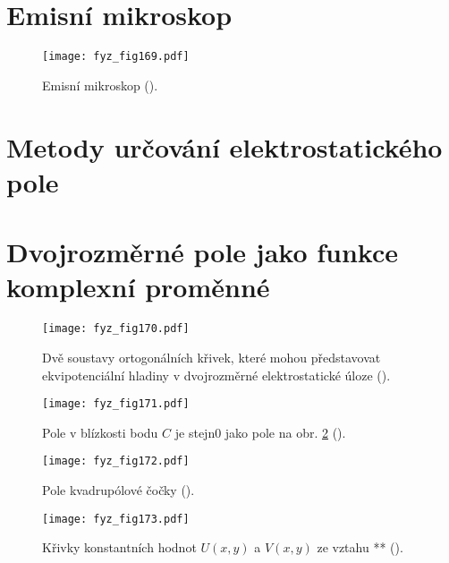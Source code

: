 \section{Emisní mikroskop}\label{fyz:IIchapVsecXXI}

  \begin{figure}[ht!]  %
    \centering
    \texttt{[image: fyz\_fig169.pdf]}
    \caption{Emisní mikroskop (\cite[s.~118]{Feynman02}).}
    \label{fyz:fig169}
  \end{figure}
  
\section{Metody určování elektrostatického pole}\label{fyz:IIchapVsecXXII}
\section{Dvojrozměrné pole jako funkce komplexní proměnné}\label{fyz:IIchapVsecXXIII}

  \begin{figure}[ht!]  %
    \centering
    \texttt{[image: fyz\_fig170.pdf]}
    \caption{Dvě soustavy ortogonálních křivek, které mohou představovat ekvipotenciální hladiny v 
             dvojrozměrné elektrostatické úloze 
             (\cite[s.~126]{Feynman02}).}
    \label{fyz:fig170}
  \end{figure}

  \begin{figure}[ht!]  %
    \centering
    \texttt{[image: fyz\_fig171.pdf]}
    \caption{Pole v blízkosti bodu \(C\) je stejn0 jako pole na obr. \ref{fyz:fig170}
             (\cite[s.~127]{Feynman02}).}
    \label{fyz:fig171}
  \end{figure}

  \begin{figure}[ht!]  %
    \centering
    \texttt{[image: fyz\_fig172.pdf]}
    \caption{Pole kvadrupólové čočky
             (\cite[s.~127]{Feynman02}).}
    \label{fyz:fig172}
  \end{figure}

  \begin{figure}[ht!]  %
    \centering
    \texttt{[image: fyz\_fig173.pdf]}
    \caption{Křivky konstantních hodnot \(U(x, y)\) a \(V(x, y)\) ze vztahu **
             (\cite[s.~128]{Feynman02}).}
    \label{fyz:fig173}
  \end{figure}

